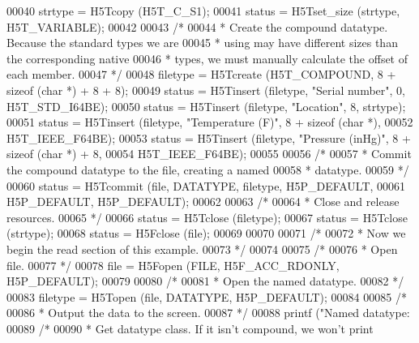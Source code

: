 \begin{DoxyCode}
00040     strtype = H5Tcopy (H5T\_C\_S1);
00041     status = H5Tset\_size (strtype, H5T\_VARIABLE);
00042 
00043     \textcolor{comment}{/*}
00044 \textcolor{comment}{     * Create the compound datatype.  Because the standard types we are}
00045 \textcolor{comment}{     * using may have different sizes than the corresponding native}
00046 \textcolor{comment}{     * types, we must manually calculate the offset of each member.}
00047 \textcolor{comment}{     */}
00048     filetype = H5Tcreate (H5T\_COMPOUND, 8 + \textcolor{keyword}{sizeof} (\textcolor{keywordtype}{char} *) + 8 + 8);
00049     status = H5Tinsert (filetype, \textcolor{stringliteral}{"Serial number"}, 0, H5T\_STD\_I64BE);
00050     status = H5Tinsert (filetype, \textcolor{stringliteral}{"Location"}, 8, strtype);
00051     status = H5Tinsert (filetype, \textcolor{stringliteral}{"Temperature (F)"}, 8 + \textcolor{keyword}{sizeof} (\textcolor{keywordtype}{char} *),
00052                 H5T\_IEEE\_F64BE);
00053     status = H5Tinsert (filetype, \textcolor{stringliteral}{"Pressure (inHg)"}, 8 + \textcolor{keyword}{sizeof} (\textcolor{keywordtype}{char} *) + 8,
00054                 H5T\_IEEE\_F64BE);
00055 
00056     \textcolor{comment}{/*}
00057 \textcolor{comment}{     * Commit the compound datatype to the file, creating a named}
00058 \textcolor{comment}{     * datatype.}
00059 \textcolor{comment}{     */}
00060     status = H5Tcommit (file, DATATYPE, filetype, H5P\_DEFAULT,
00061                 H5P\_DEFAULT, H5P\_DEFAULT);
00062 
00063     \textcolor{comment}{/*}
00064 \textcolor{comment}{     * Close and release resources.}
00065 \textcolor{comment}{     */}
00066     status = H5Tclose (filetype);
00067     status = H5Tclose (strtype);
00068     status = H5Fclose (file);
00069 
00070 
00071     \textcolor{comment}{/*}
00072 \textcolor{comment}{     * Now we begin the read section of this example.}
00073 \textcolor{comment}{     */}
00074 
00075     \textcolor{comment}{/*}
00076 \textcolor{comment}{     * Open file.}
00077 \textcolor{comment}{     */}
00078     file = H5Fopen (FILE, H5F\_ACC\_RDONLY, H5P\_DEFAULT);
00079 
00080     \textcolor{comment}{/*}
00081 \textcolor{comment}{     * Open the named datatype.}
00082 \textcolor{comment}{     */}
00083     filetype = H5Topen (file, DATATYPE, H5P\_DEFAULT);
00084 
00085     \textcolor{comment}{/*}
00086 \textcolor{comment}{     * Output the data to the screen.}
00087 \textcolor{comment}{     */}
00088     printf (\textcolor{stringliteral}{"Named datatype: %
00089     \textcolor{comment}{/*}
00090 \textcolor{comment}{     * Get datatype class.  If it isn't compound, we won't print}
}
\end{DoxyCode}
